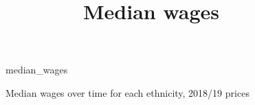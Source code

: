 \documentclass[class=article, crop=false]{standalone}
\begin{document}
\begin{figure}[]
\centering
    \title{Median wages}
    {median_wages}
    \caption{Median wages over time for each ethnicity, 2018/19 prices}
    \label{fig:median_wages}
\end{figure}



\begin{comment}
\begin{enumerate}
    \item Tabulate the number of people in each 2-digit SIC92 for each ethnicity used.
    \item Blinder-Oaxaca decomposition.
    \item Pseudo-panel data??
    \item Clustering --- but can only happen for 2001 onwards
    \item Head of household --- only keep the head of the household, but mostly men (show stats to prove this! AND show if and when the definition changes)
\end{enumerate}
Issues with ommited variables in the oaxaca decomps --- are they consistent?

\end{comment}

\begin{comment}
{occup_male}
{occup_female}
\newpage
{unexplained_male_stacked} %
\newpage
{explained_female_stacked}
\newpage
{explained_male_stacked}
\newpage
{unexplained_female_stacked}
\end{comment}


\ifstandalone

\fi
\end{document}
